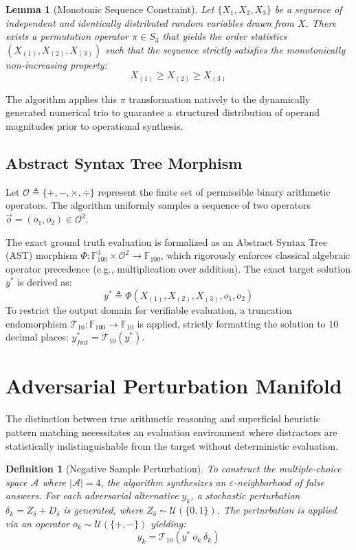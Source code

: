 \documentclass[12pt, a4paper]{article}
\newtheorem{lemma}[theorem]{Lemma}
\newtheorem{definition}[theorem]{Definition}
\begin{document}
\begin{lemma}[Monotonic Sequence Constraint]
Let $\{X_1, X_2, X_3\}$ be a sequence of independent and identically distributed random variables drawn from $X$. There exists a permutation operator $\pi \in S_3$ that yields the order statistics $(X_{(1)}, X_{(2)}, X_{(3)})$ such that the sequence strictly satisfies the monotonically non-increasing property:
\begin{equation}
X_{(1)} \ge X_{(2)} \ge X_{(3)}
\end{equation}
\end{lemma}
The algorithm applies this $\pi$ transformation natively to the dynamically generated numerical trio to guarantee a structured distribution of operand magnitudes prior to operational synthesis.

\subsection{Abstract Syntax Tree Morphism}
Let $\mathcal{O} \triangleq \{+, -, \times, \div\}$ represent the finite set of permissible binary arithmetic operators. The algorithm uniformly samples a sequence of two operators $\vec{o} = (o_1, o_2) \in \mathcal{O}^2$.

The exact ground truth evaluation is formalized as an Abstract Syntax Tree (AST) morphism $\Phi: \mathbb{F}_{100}^3 \times \mathcal{O}^2 \to \mathbb{F}_{100}$, which rigorously enforces classical algebraic operator precedence (e.g., multiplication over addition). 
The exact target solution $y^*$ is derived as:
\begin{equation}
y^* \triangleq \Phi(X_{(1)}, X_{(2)}, X_{(3)}, o_1, o_2)
\end{equation}
To restrict the output domain for verifiable evaluation, a truncation endomorphism $\mathcal{T}_{10}: \mathbb{F}_{100} \to \mathbb{F}_{10}$ is applied, strictly formatting the solution to $10$ decimal places: $y^*_{fmt} = \mathcal{T}_{10}(y^*)$.

\section{Adversarial Perturbation Manifold}

The distinction between true arithmetic reasoning and superficial heuristic pattern matching necessitates an evaluation environment where distractors are statistically indistinguishable from the target without deterministic evaluation.

\begin{definition}[Negative Sample Perturbation]
To construct the multiple-choice space $\mathcal{A}$ where $|\mathcal{A}| = 4$, the algorithm synthesizes an $\varepsilon$-neighborhood of false answers. For each adversarial alternative $y_k$, a stochastic perturbation $\delta_k = Z_\delta + D_\delta$ is generated, where $Z_\delta \sim \mathcal{U}(\{0, 1\})$. The perturbation is applied via an operator $o_k \sim \mathcal{U}(\{+, -\})$ yielding:
\begin{equation}
y_k = \mathcal{T}_{10}(y^* \ o_k \ \delta_k)
\end{equation}
\end{definition}
\end{document}
